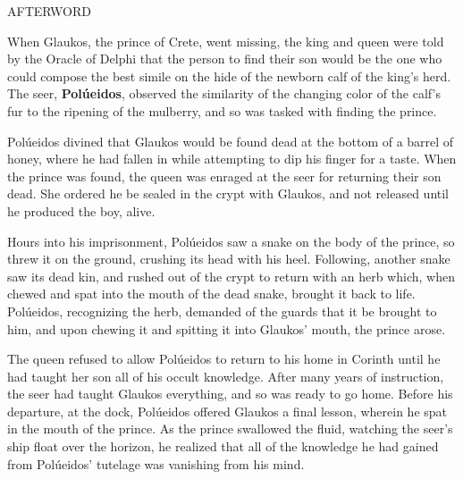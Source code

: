 \documentclass[12pt]{article}
\begin{document}
\vspace*{2.5\baselineskip}

\begin{center}
\huge AFTERWORD
\end{center}

\vspace*{2\baselineskip}

\begingroup
\hspace{10mm} When Glaukos, the prince of Crete, went missing, the king and queen were told by the Oracle of Delphi that the person to find their son would be the one who could compose the best simile on the hide of the newborn calf of the king's herd. The seer, \textbf{Polúeidos}, observed the similarity of the changing color of the calf's fur to the ripening of the mulberry, and so was tasked with finding the prince.
\endgroup

\begingroup
\hspace{10mm} Polúeidos divined that Glaukos would be found dead at the bottom of a barrel of honey, where he had fallen in while attempting to dip his finger for a taste. When the prince was found, the queen was enraged at the seer for returning their son dead. She ordered he be sealed in the crypt with Glaukos, and not released until he produced the boy, alive. 
\endgroup

\begingroup
\hspace{10mm} Hours into his imprisonment, Polúeidos saw a snake on the body of the prince, so threw it on the ground, crushing its head with his heel. Following, another snake saw its dead kin, and rushed out of the crypt to return with an herb which, when chewed and spat into the mouth of the dead snake, brought it back to life. Polúeidos, recognizing the herb, demanded of the guards that it be brought to him, and upon chewing it and spitting it into Glaukos' mouth, the prince arose. 
\endgroup

\begingroup
\hspace{10mm} The queen refused to allow Polúeidos to return to his home in Corinth until he had taught her son all of his occult knowledge. After many years of instruction, the seer had taught Glaukos everything, and so was ready to go home. Before his departure, at the dock, Polúeidos offered Glaukos a final lesson, wherein he spat in the mouth of the prince. As the prince swallowed the fluid, watching the seer's ship float over the horizon, he realized that all of the knowledge he had gained from Polúeidos' tutelage was vanishing from his mind. 
\endgroup
\end{document}
